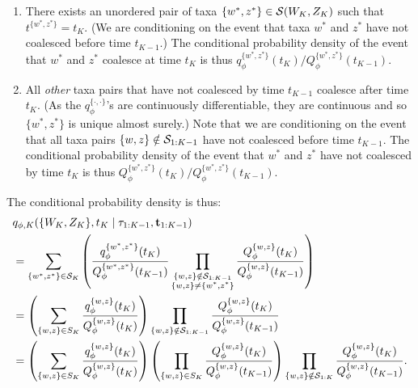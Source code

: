 \begin{doublespace}
\begin{enumerate}
    \item There exists an unordered pair of taxa $\{w^*,z^*\} \in \mathcal{S}(W_{K}, Z_{K})$ such that $t^{\{w^*,z^*\}} = t_K$.  (We are conditioning on the event that taxa $w^*$ and $z^*$ have not coalesced before time $t_{K-1}$.) The conditional probability density of the event that $w^*$ and $z^*$ coalesce at time $t_{K}$ is thus $q_\phi^{\{w^*,z^*\}}(t_{K}) / {Q_\phi^{\{w^*,z^*\}}(t_{K-1})}$.
    \item All \textit{other} taxa pairs that have not coalesced by time $t_{K-1}$ coalesce after time $t_{K}$. (As the $q_\phi^{\{\cdot,\cdot\}}$'s are continuously differentiable, they are continuous and so $\{w^*,z^*\}$ is unique almost surely.) Note that we are conditioning on the event that all taxa pairs $\{w,z\} \notin \mathcal{S}_{1:K-1}$ have not coalesced before time $t_{K-1}$. The conditional probability density of the event that $w^*$ and $z^*$ have not coalesced by time $t_{K}$ is thus ${Q_\phi^{\{w^*,z^*\}}(t_{K})} / {Q_\phi^{\{w^*,z^*\}}(t_{K-1})}$.
\end{enumerate}
\vspace{-1em}
The conditional probability density is thus:
\begin{align}
    & q_{\phi,K}(\{W_K,Z_K\},t_{K} \mid \tau_{1:K-1},\mathbf{t}_{1:K-1}) \\
    &= \sum_{\{w^*,z^*\} \in \mathcal{S}_K} \left( \frac{q_\phi^{\{w^*,z^*\}}(t_{K})}{Q_\phi^{\{w^*,z^*\}}(t_{K-1})} \prod_{\substack{\{w,z\} \notin \mathcal{S}_{1:K-1} \\ \{w,z\} \neq \{w^*, z^*\}}} \frac{Q_\phi^{\{w,z\}}(t_{K})}{Q_\phi^{\{w,z\}}(t_{K-1})}  \right)\label{eqn:stars}\\
    &= \left(\sum_{\{w,z\} \in S_K} \frac{q_\phi^{\{w,z\}}(t_{K})}{Q_\phi^{\{w,z\}}(t_{K})}\right)
    \prod_{\{w,z\} \notin \mathcal{S}_{1:K-1}} \frac{Q_\phi^{\{w,z\}}(t_{K})}{Q_\phi^{\{w,z\}}(t_{K-1})} \\
    &= \left(\sum_{\{w,z\} \in S_K} \frac{q_\phi^{\{w,z\}}(t_{K})}{Q_\phi^{\{w,z\}}(t_{K})}\right)
    \left(\prod_{\{w,z\} \in S_K} \frac{Q_\phi^{\{w,z\}}(t_{K})}{Q_\phi^{\{w,z\}}(t_{K-1})}  \right)
    \prod_{\{w,z\} \notin \mathcal{S}_{1:K}} \frac{Q_\phi^{\{w,z\}}(t_{K})}{Q_\phi^{\{w,z\}}(t_{K-1})}.
\end{align}


\end{doublespace}

